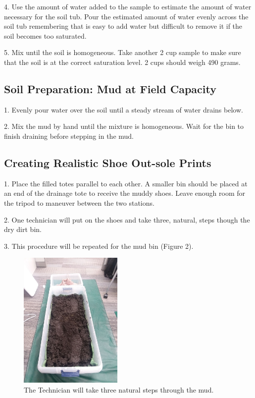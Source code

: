 4. Use the amount of water added to the sample to estimate the amount of water necessary for the soil tub. Pour the estimated amount of water evenly across the soil tub remembering that is easy to add water but difficult to remove it if the soil becomes too saturated. 

5. Mix until the soil is homogeneous. Take another 2 cup sample to make sure that the soil is at the correct saturation level. 2 cups should weigh 490 grams. 

\subsection{Soil Preparation: Mud at Field Capacity} 

1. Evenly pour water over the soil until a steady stream of water drains below. 

2. Mix the mud by hand until the mixture is homogeneous. Wait for the bin to finish draining before stepping in the mud. 

\subsection{Creating Realistic Shoe Out-sole Prints}

1. Place the filled totes parallel to each other. A smaller bin should be placed at an end of the drainage tote to receive the muddy shoes. Leave enough room for the tripod to maneuver between the two stations.

2. One technician will put on the shoes and take three, natural, steps though the dry dirt bin. 

3. This procedure will be repeated for the mud bin (Figure 2). 

\begin{figure}[!htp]
\centering
\includegraphics[width=5cm]{Cast_Bin}
\caption{The Technician will take three natural steps through the mud. }
\label{Image 2}
\end{figure}

